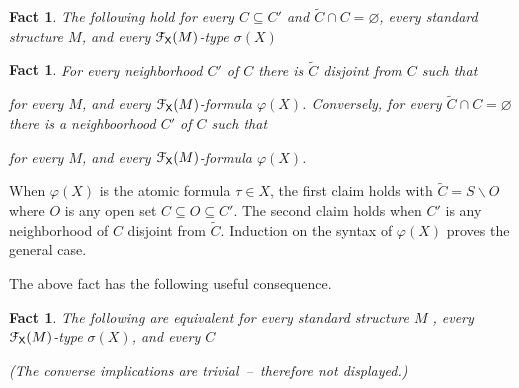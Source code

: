 \documentclass{amsproc}
\makeatletter
\newcounter{thm}
\theoremstyle{mio}
\newtheorem{fact}[thm]{Fact}\tcolorboxenvironment{fact}{mythm}
\providecommand{\proofNameStyle}{\bfseries}
\renewenvironment{proof}[1][\proofname]{\par
  \pushQED{\qed}%
  \normalfont%
  \trivlist
  \item[\hskip\labelsep
        \proofNameStyle
    #1\@addpunct{.}]\ignorespaces
}{%
  \popQED\endtrivlist\@endpefalse
}
\makeatother
\begin{document}
\begin{fact}\label{fact_trivial}
  The following hold for every $C\subseteq C'$ and $\tilde C\cap C=\varnothing$, every standard structure $M$, and every ${\EuScript F}_{\sf X}(M)$-type $\sigma(X)$\smallskip

  \smallskip

  \smallskip
  
\end{fact}

\begin{fact}
  For every neighborhood $C'$ of $C$ there is $\tilde C$ disjoint from $C$ such that\smallskip
  
  \smallskip

  for every $M$, and every ${\EuScript F}_{\sf X}(M)$-formula $\varphi(X)$.
  Conversely, for every $\tilde C\cap C=\varnothing$ there is a neighboorhood $C'$ of $C$ such that

  \smallskip

  for every $M$, and every ${\EuScript F}_{\sf X}(M)$-formula $\varphi(X)$.
\end{fact}

\begin{proof}
  When $\varphi(X)$ is the atomic formula $\tau\in X$, the first claim holds with $\tilde C=S\smallsetminus O$ where $O$ is any open set $C\subseteq O\subseteq C'$.
  The second claim holds when $C'$ is any neighborhood of $C$ disjoint from $\tilde C$.
  Induction on the syntax of $\varphi(X)$ proves the general case.
\end{proof}

The above fact has the following useful consequence.

\begin{fact}\label{fact_otto}
  The following are equivalent for every standard structure $M$ , every ${\EuScript F}_{\sf X}(M)$-type $\sigma(X)$, and every $C$\smallskip
  
    \smallskip

    \smallskip

  (The converse implications are trivial~--~therefore not displayed.)
\end{fact}
\end{document}
